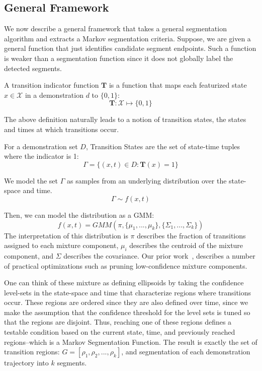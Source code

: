 \subsection{General Framework}
We now describe a general framework that takes a general segmentation algorithm and extracts a Markov segmentation criteria.
Suppose, we are given a general function that just identifies candidate segment endpoints.
Such a function is weaker than a segmentation function since it does not globally label the detected segments.

\begin{definition}
A transition indicator function $\mathbf{T}$ is a function that maps each featurized state $x \in \mathcal{X}$ in a demonstration $d$ to $\{0,1\}$:
\[
\mathbf{T}: \mathcal{X} \mapsto \{0,1\}
\]
\end{definition}

The above definition naturally leads to a notion of transition states, the states and times at which transitions occur.

\begin{definition}
For a demonstration set $D$, Transition States are the set of state-time tuples where the indicator is 1:
\[
\Gamma = \{(x,t) \in D : \mathbf{T}(x) = 1\}
\]
\end{definition}

We model the set $\Gamma$ as samples from an underlying distribution over the state-space and time.
\[
\Gamma \sim f(x,t)
\]


Then, we can model the distribution as a GMM:
\[
f(x,t) = GMM(\pi,\{\mu_1,...,\mu_k\}, \{\Sigma_1,...,\Sigma_k\})
\]
The interpretation of this distribution is $\pi$ describes the fraction of transitions assigned to each mixture component, $\mu_i$ describes the centroid of the mixture component, and $\Sigma$ describes the covariance.
Our prior work~\cite{krishnan2015tsc,murali2016}, describes a number of practical optimizations such as pruning low-confidence mixture components.

One can think of these mixture as defining ellipsoids by taking the confidence level-sets in the state-space and time that characterize regions where transitions occur.
These regions are ordered since they are also defined over time, since we make the assumption that the confidence threshold for the level sets is tuned so that the regions are disjoint.
Thus, reaching one of these regions defines a testable condition based on the current state, time, and previously reached regions--which is a Markov Segmentation Function.
The result is exactly the set of transition regions: $G = [\rho_1, \rho_2,...,\rho_k]$, and segmentation of each demonstration trajectory into $k$ segments.

